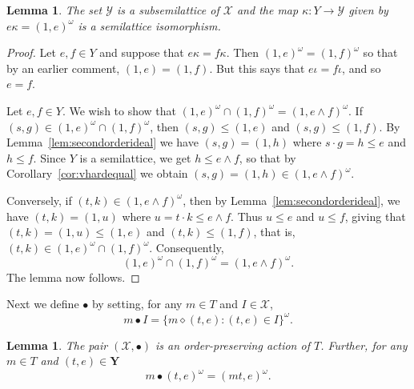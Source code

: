 \documentclass[12pt]{amsart}
\newtheorem{lem}[them]{Lemma}
\theoremstyle{definition}
\theoremstyle{definition}
\numberwithin{them}{section}
\numberwithin{equation}{section}
\begin{document}
\begin{lem}\label{EYiso}
The set $\mathcal{Y}$ is a subsemilattice  of $\mathcal{X}$ and the map $\kappa:Y \rightarrow \mathcal{Y}$ given by $e \kappa = (1,e)^\omega$ is a semilattice isomorphism. 
\end{lem}
\begin{proof} Let $e,f\in Y$ and suppose that $e\kappa=f\kappa$. Then $(1,e)^\omega=(1,f)^\omega$ so that by an earlier comment, 
$(1,e)=(1,f)$. But this says that
$e\iota=f\iota$, and so $e=f$. 

Let $e,f\in Y$. We wish to show that $(1,e)^\omega\cap (1,f)^\omega = (1, e\wedge f)^\omega$. If
$(s,g)\in (1,e)^\omega\cap (1,f)^\omega$, then
$(s,g)\leq (1,e)$ and $(s,g)\leq (1,f)$. By Lemma~\ref{lem:secondorderideal} we have 
$(s,g)=(1,h)$ where $s\cdot g=h\leq e$ and $h\leq f$. Since $Y$ is a semilattice, we get $h\leq e\wedge f$, so that
 by Corollary~\ref{cor:vhardequal} 
we obtain
$(s,g)=(1,h)\in (1, e\wedge f)^\omega$. 

Conversely, if $(t,k)\in (1,e\wedge f)^\omega$, then  by Lemma~\ref{lem:secondorderideal}, we have 
$(t,k)=(1,u)$ where  $u=t\cdot k\leq e\wedge f$. Thus $u\leq e$ and $u\leq f$, giving that
$(t,k)=(1,u)\leq (1,e)$ and $(t,k)\leq (1,f)$, that is, $(t,k)\in (1,e)^\omega\cap (1,f)^\omega$. Consequently, 
\[(1,e)^\omega\cap (1,f)^\omega=
(1,e\wedge f)^\omega.\] 
The lemma now follows.
\end{proof}


Next we define  $\bullet$ by setting, for any $m\in T$ and $I\in\mathcal{X}$,
\[m\bullet I = \{m \diamond (t,e): (t,e) \in I\}^\omega.\]

\begin{lem}\label{lem:slaction}  The pair 
  $(\mathcal{X},\bullet)$ is an order-preserving action of $T$.
 Further, for any $m\in T$ and $(t,e)\in \mathbf{Y}$
\[m\bullet (t,e)^\omega = (mt,e)^\omega.\]
\end{lem}
\end{document}
